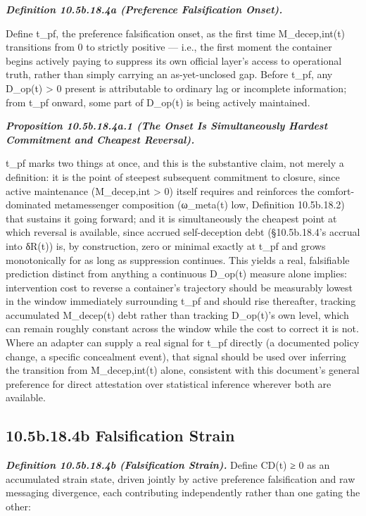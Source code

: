 \documentclass[
]{article}
\begin{document}
\emph{\textbf{Definition 10.5b.18.4a (Preference Falsification Onset).}}

Define t\_pf, the preference falsification onset, as the first time
M\_decep,int(t) transitions from 0 to strictly positive --- i.e., the
first moment the container begins actively paying to suppress its own
official layer's access to operational truth, rather than simply
carrying an as-yet-unclosed gap. Before t\_pf, any D\_op(t)
\textgreater{} 0 present is attributable to ordinary lag or incomplete
information; from t\_pf onward, some part of D\_op(t) is being actively
maintained.

\emph{\textbf{Proposition 10.5b.18.4a.1 (The Onset Is Simultaneously
Hardest Commitment and Cheapest Reversal).}}

t\_pf marks two things at once, and this is the substantive claim, not
merely a definition: it is the point of steepest subsequent commitment
to closure, since active maintenance (M\_decep,int \textgreater{} 0)
itself requires and reinforces the comfort-dominated metamessenger
composition (ω\_meta(t) low, Definition 10.5b.18.2) that sustains it
going forward; and it is simultaneously the cheapest point at which
reversal is available, since accrued self-deception debt (§10.5b.18.4's
accrual into δR(t)) is, by construction, zero or minimal exactly at
t\_pf and grows monotonically for as long as suppression continues. This
yields a real, falsifiable prediction distinct from anything a
continuous D\_op(t) measure alone implies: intervention cost to reverse
a container's trajectory should be measurably lowest in the window
immediately surrounding t\_pf and should rise thereafter, tracking
accumulated M\_decep(t) debt rather than tracking D\_op(t)'s own level,
which can remain roughly constant across the window while the cost to
correct it is not. Where an adapter can supply a real signal for t\_pf
directly (a documented policy change, a specific concealment event),
that signal should be used over inferring the transition from
M\_decep,int(t) alone, consistent with this document's general
preference for direct attestation over statistical inference wherever
both are available.

\hypertarget{b.18.4b-falsification-strain}{%
\subsection{10.5b.18.4b Falsification
Strain}\label{b.18.4b-falsification-strain}}

\emph{\textbf{Definition 10.5b.18.4b (Falsification Strain).}} Define
CD(t) ≥ 0 as an accumulated strain state, driven jointly by active
preference falsification and raw messaging divergence, each contributing
independently rather than one gating the other:
\end{document}
